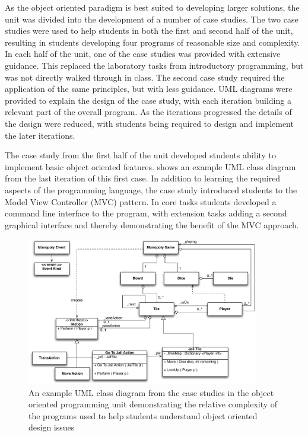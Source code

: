 As the object oriented paradigm is best suited to developing larger solutions, the unit was divided into the development of a number of case studies. The two case studies were used to help students in both the first and second half of the unit, resulting in students developing four programs of reasonable size and complexity. In each half of the unit, one of the case studies was provided with extensive guidance. This replaced the laboratory tasks from introductory programming, but was not directly walked through in class. The second case study required the application of the same principles, but with less guidance. UML diagrams were provided to explain the design of the case study, with each iteration building a relevant part of the overall program. As the iterations progressed the details of the design were reduced, with students being required to design and implement the later iterations.

The case study from the first half of the unit developed students ability to implement basic object oriented features.  shows an example UML class diagram from the last iteration of this first case. In addition to learning the required aspects of the programming language, the case study introduced students to the Model View Controller (MVC) pattern. In core tasks students developed a command line interface to the program, with extension tasks adding a second graphical interface and thereby demonstrating the benefit of the MVC approach.

\begin{figure}[htbp]
	\centering
	\includegraphics[width=0.9\textwidth]{Monopoly}
	\caption{An example UML class diagram from the case studies in the object oriented programming unit demonstrating the relative complexity of the programs used to help students understand object oriented design issues}
	\label{fig:monopoly}
\end{figure}


